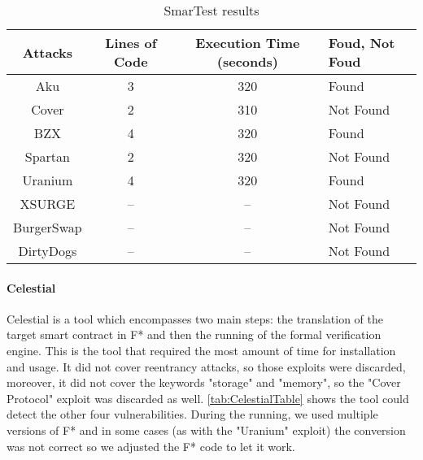 \begin{center}
    \begin{table*}
        \caption{SmarTest results}
            \label{tab:SmarTestTable}
            \begin{tabular}{cccl}
            \toprule
                Attacks & Lines of Code & Execution Time (seconds) & Foud, Not Foud\\
                \midrule
                Aku & 3 & 320 & Found \\ 
                Cover & 2 & 310& Not Found\\ 
                BZX  & 4 & 320 & Found\\ 
                Spartan & 2 & 320& Not Found\\ 
                Uranium  & 4 & 320 & Found \\ 
                XSURGE &  -- & -- & Not Found \\  
                BurgerSwap &  -- & -- & Not Found\\ 
                DirtyDogs &  -- & -- & Not Found \\
            \bottomrule
            \end{tabular}
        \end{table*}
\end{center}


\paragraph{Celestial} 
Celestial is a tool which encompasses two main steps: the translation of the target smart contract in F* and then the running of the formal verification engine. 
This is the tool that required the most amount of time for installation and usage. 
It did not cover reentrancy attacks, so those exploits were discarded, moreover, it did not cover the keywords "storage" and "memory", 
so the "Cover Protocol" exploit was discarded as well. \autoref{tab:CelestialTable} shows the tool could detect the other four vulnerabilities.
During the running, we used multiple versions of F* and in some cases (as with the "Uranium" exploit) the conversion was not correct so we adjusted the F* code to let it work. 


